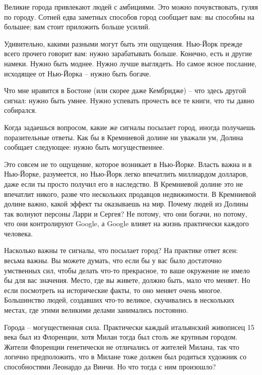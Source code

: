 \documentclass[ebook,12pt,oneside,openany]{memoir}
\begin{document}
\maketitle

Великие города привлекают людей с амбициями. Это можно почувствовать,
гуляя по городу. Сотней едва заметных способов город сообщает вам: вы
способны на большее; вам стоит приложить больше усилий.

Удивительно, какими разными могут быть эти ощущения. Нью-Йорк прежде
всего прочего говорит вам: нужно зарабатывать больше. Конечно, есть и
другие намеки. Нужно быть моднее. Нужно лучше выглядеть. Но самое
ясное послание, исходящее от Нью-Йорка – нужно быть богаче.

Что мне нравится в Бостоне (или скорее даже Кембридже) – что здесь
другой сигнал: нужно быть умнее. Нужно успевать прочесть все те книги,
что ты давно собирался.

Когда задаешься вопросом, какие же сигналы посылает город, иногда
получаешь поразительные ответы. Как бы в Кремниевой долине ни уважали
ум, Долина сообщает следующее: нужно быть могущественнее.

Это совсем не то ощущение, которое возникает в Нью-Йорке. Власть важна
и в Нью-Йорке, разумеется, но Нью-Йорк легко впечатлить миллиардом
долларов, даже если ты просто получил его в наследство. В Кремниевой
долине это не впечатлит никого, разве что нескольких продавцов
недвижимости. В Кремниевой долине важно, какой эффект ты оказываешь на
мир. Почему людей из Долины так волнуют персоны Ларри и Сергея? Не
потому, что они богачи, но потому, что они контролируют Google, а
Google влияет на жизнь практически каждого человека.

Насколько важны те сигналы, что посылает город? На практике ответ
ясен: весьма важны. Вы можете думать, что если бы у вас было
достаточно умственных сил, чтобы делать что-то прекрасное, то ваше
окружение не имело бы для вас значения. Место, где вы живете, должно
быть, мало что меняет. Но если посмотреть на исторические факты, то
оно меняет очень многое. Большинство людей, создавших что-то великое,
скучивались в нескольких местах, где этими великими делами занимались
постоянно.

Города – могущественная сила. Практически каждый итальянский живописец
15 века был из Флоренции, хотя Милан тогда был столь же крупным
городом. Жители Флоренции генетически не отличались от жителей Милана,
так что логично предположить, что в Милане тоже должен был родиться
художник со способностями Леонардо да Винчи. Но что тогда с ним
произошло?
\end{document}
